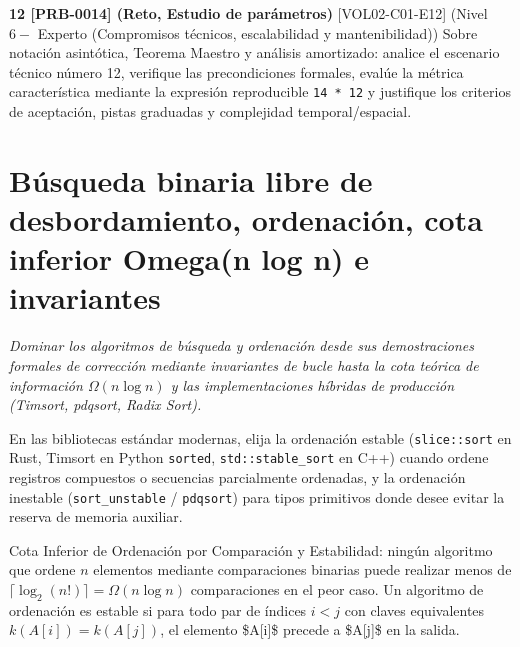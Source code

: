 \documentclass{book}
\begin{document}
\begin{tcolorbox}[title={Ejercicios}, studiumworked, breakable]
\noindent\textbf{12 [PRB-0014] (Reto, Estudio de parámetros)}
[VOL02-C01-E12] (Nivel \(6 -\) Experto (Compromisos técnicos, escalabilidad y mantenibilidad)) Sobre notación asintótica, Teorema Maestro y análisis amortizado: analice el escenario técnico número 12, verifique las precondiciones formales, evalúe la métrica característica mediante la expresión reproducible \texttt{14 * 12} y justifique los criterios de aceptación, pistas graduadas y complejidad temporal/espacial.
\end{tcolorbox}

\chapter{Búsqueda binaria libre de desbordamiento, ordenación, cota inferior Omega(n log n) e invariantes}
\label{chap:cap02-busqueda-ordenacion-cotas-inferiores}

\noindent\textit{Dominar los algoritmos de búsqueda y ordenación desde sus demostraciones formales de corrección mediante invariantes de bucle hasta la cota teórica de información \(\Omega(n \log n)\) y las implementaciones híbridas de producción (Timsort, pdqsort, Radix Sort).}

\begin{tcolorbox}[title={Consejo}, studiumtip, breakable]

En las bibliotecas estándar modernas, elija la ordenación estable (\texttt{slice::sort} en Rust, Timsort en Python \texttt{sorted}, \texttt{std::stable\_sort} en C++) cuando ordene registros compuestos o secuencias parcialmente ordenadas, y la ordenación inestable (\texttt{sort\_unstable} / \texttt{pdqsort}) para tipos primitivos donde desee evitar la reserva de memoria auxiliar.
\end{tcolorbox}

\begin{tcolorbox}[title={Definición}, studiumdef, breakable]

Cota Inferior de Ordenación por Comparación y Estabilidad: ningún algoritmo que ordene \(n\) elementos mediante comparaciones binarias puede realizar menos de \(\lceil \log_2(n!) \rceil = \Omega(n \log n)\) comparaciones en el peor caso. Un algoritmo de ordenación es estable si para todo par de índices \(i < j\) con claves equivalentes \(k(A[i]) = k(A[j])\), el elemento \$A[i]\$ precede a \$A[j]\$ en la salida.
\end{tcolorbox}
\end{document}
